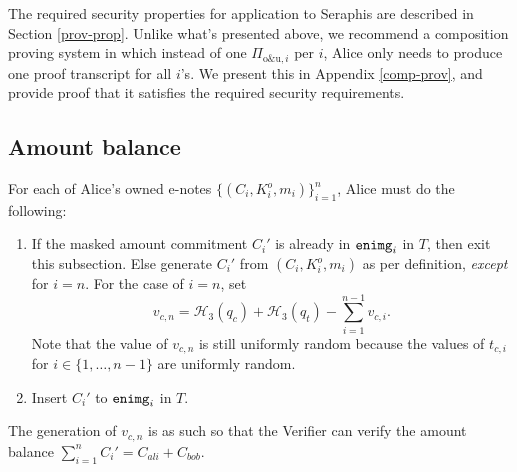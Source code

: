 \documentclass{article}
\begin{document}
The required security properties for application to Seraphis are described in Section \ref{prov-prop}. Unlike what's presented above, we recommend a composition proving system in which instead of one $\Pi_{\text{o\&u}, i}$ per $i$, Alice only needs to produce one proof transcript for all $i$'s. We present this in Appendix \ref{comp-prov}, and provide proof that it satisfies the required security requirements.

\subsection{Amount balance}\label{amt-bal}
For each of Alice's owned e-notes $\{(C_i,K_i^o,m_i)\}_{i=1}^n$, Alice must do the following:
\begin{enumerate}
    \item If the masked amount commitment $C_i'$ is already in ${\tt enimg}_i$ in $T$, then exit this subsection. Else generate $C_i'$ from $(C_i, K_i^o, m_i)$ as per definition, \textit{except} for $i=n$. For the case of $i=n$, set
    $$v_{c,n} = \mathcal{H}_3(q_c) + \mathcal{H}_3(q_t) - \sum_{i=1}^{n-1}{v_{c,i}}.$$
    Note that the value of $v_{c,n}$ is still uniformly random because the values of $t_{c,i}$ for $i\in\{1,\ldots,n-1\}$ are uniformly random.
    \item Insert $C_i'$ to ${\tt enimg}_i$ in $T$.
\end{enumerate}
The generation of $v_{c,n}$ is as such so that the Verifier can verify the amount balance $\sum_{i=1}^n{C_i'}=C_{ali}+C_{bob}$.
\end{document}
